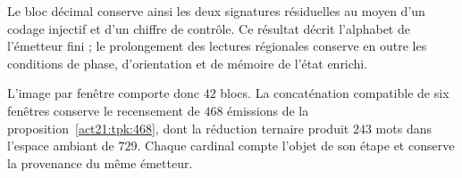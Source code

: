 Le bloc décimal conserve ainsi les deux signatures résiduelles au moyen d'un codage injectif et d'un chiffre de contrôle. Ce résultat décrit l'alphabet de l'émetteur fini ; le prolongement des lectures régionales conserve en outre les conditions de phase, d'orientation et de mémoire de l'état enrichi.

L'image par fenêtre comporte donc \(42\) blocs. La concaténation
compatible de six fenêtres conserve le recensement de \(468\) émissions de
la proposition~\ref{act21:tpk:468}, dont la réduction ternaire produit
\(243\) mots dans l'espace ambiant de \(729\). Chaque cardinal compte
l'objet de son étape et conserve la provenance du même émetteur.
